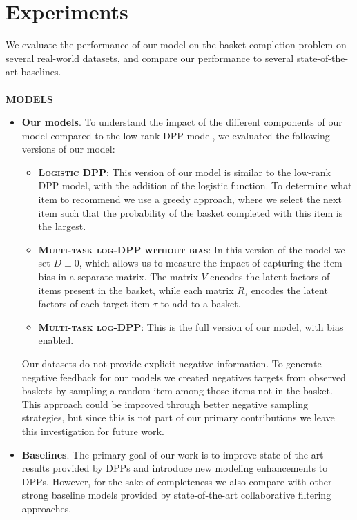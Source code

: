 
\section{Experiments}
We evaluate the performance of our model on the basket completion problem on several real-world datasets,
and compare our performance to several state-of-the-art baselines. \\
\\
\noindent
\textbf{MODELS}  
\begin{itemize}
\item \textbf{Our models}. To understand the impact of the different components
of our model compared to the low-rank DPP model, we evaluated the following
versions of our model:
\begin{itemize}
\item \textbf{\textsc{Logistic DPP}}: This version of our model is
similar to the low-rank DPP model, with the addition of the logistic function.
To determine what item to recommend we use a greedy approach, where we select
the next item such that the probability of the basket completed with this item
is the largest. 
\item \textbf{\textsc{Multi-task log-DPP without bias}}:
In this version of the model we set $D\equiv 0$, which allows us to measure the
impact of capturing the item bias in a separate matrix.  The matrix $V$ encodes
the latent factors of items present in the basket, while each matrix $R_{\tau}$
encodes the latent factors of each target item $\tau$ to add to a basket. 
\item \textbf{\textsc{Multi-task log-DPP}}: This is the full version of our
model, with bias enabled.
\end{itemize}
Our datasets do not provide explicit negative information.  To generate negative
feedback for our models we created negatives targets from observed baskets by
sampling a random item among those items not in the basket. This approach could
be improved through better negative sampling strategies, but since this is not
part of our primary contributions we leave this investigation for future work. 
\item \textbf{Baselines}. The primary goal of our work is to improve
state-of-the-art results provided by DPPs and introduce new modeling
enhancements to DPPs. However, for the sake of completeness we also compare with
other strong baseline models provided by state-of-the-art collaborative
filtering approaches.
\begin{itemize}

\end{itemize}
\end{itemize}
